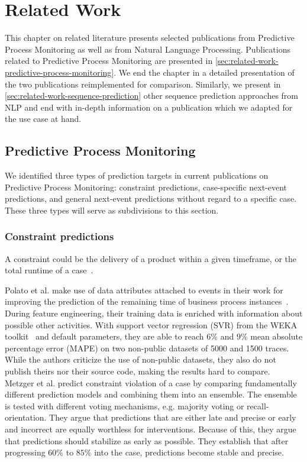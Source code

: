 \chapter{Related Work}\label{chap:related-work}
This chapter on related literature presents selected publications from Predictive Process Monitoring as well as from Natural Language Processing. Publications related to Predictive Process Monitoring are presented in \autoref{sec:related-work-predictive-process-monitoring}. We end the chapter in a detailed presentation of the two publications reimplemented for comparison. Similarly, we present in \autoref{sec:related-work-sequence-prediction} other sequence prediction approaches from NLP and end with in-depth information on a publication which we adapted for the use case at hand.

\section{Predictive Process Monitoring}\label{sec:related-work-predictive-process-monitoring}
We identified three types of prediction targets in current publications on Predictive Process Monitoring: constraint predictions, case-specific next-event predictions, and general next-event predictions without regard to a specific case. These three types will serve as subdivisions to this section.

\subsection*{Constraint predictions}
A constraint could be the delivery of a product within a given timeframe, or the total runtime of a case~\cite{weske2012business, francescomarino2015}.

Polato et al. make use of data attributes attached to events in their work for improving the prediction of the remaining time of business process instances~\cite{polato2014}. During feature engineering, their training data is enriched with information about possible other activities. With support vector regression (SVR) from the WEKA toolkit~\cite{web:weka} and default parameters, they are able to reach $6\%$ and $9\%$ mean absolute percentage error (MAPE) on two non-public datasets of 5000 and 1500 traces. While the authors criticize the use of non-public datasets, they also do not publish theirs nor their source code, making the results hard to compare.\\

Metzger et al. predict constraint violation of a case by comparing fundamentally different prediction models and combining them into an ensemble. The ensemble is tested with different voting mechanisms, e.g. majority voting or recall-orientation. They argue that predictions that are either late and precise or early and incorrect are equally worthless for interventions. Because of this, they argue that predictions should stabilize as early as possible. They establish that after progressing $60\%$ to $85\%$ into the case, predictions become stable and precise.

